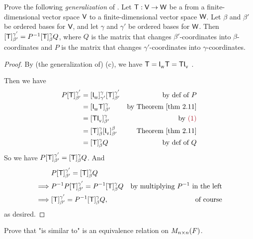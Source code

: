 \begin{exercise} \label{exercise 2.5.8}
Prove the following \emph{generalization} of .
Let \(\textsf{T} : \textsf{V} \to \textsf{W}\) be a \LTRAN{} from a finite-dimensional vector space \(\textsf{V}\) to a finite-dimensional vector space \(\textsf{W}\).
Let \(\beta\) and \(\beta'\) be ordered bases for \(\textsf{V}\), and let \(\gamma\) and \(\gamma'\) be ordered bases for \(\textsf{W}\).
Then \([\textsf{T}]_{\beta'}^{\gamma'} = P^{-1} [\textsf{T}]_{\beta}^{\gamma} Q\), where \(Q\) is the matrix that changes \(\beta'\)-coordinates into \(\beta\)-coordinates and \(P\) is the matrix that changes \(\gamma'\)-coordinates into \(\gamma\)-coordinates.
\end{exercise}

\begin{proof}
By (the generalization of) (c), we have \(\textsf{T} = \textsf{I}_{_{\textsf{W}}} \textsf{T} = \textsf{T} \textsf{I}_{_{\textsf{V}}}\) .

Then we have
\begin{align*}
    P [\T]_{\beta'}^{\gamma'}
        & = [\ITRANW]_{\gamma'}^{\gamma} [\T]_{\beta'}^{\gamma'} & \text{by def of \(P\)} \\
        & = [\ITRANW\T]_{\beta'}^{\gamma} & \text{by \THM{2.11}} \\
        & = [\T\ITRANV]_{\beta'}^{\gamma} & \text{by \MAROON{(1)}} \\
        & = [\T]_{\beta}^{\gamma} [\ITRANV]_{\beta'}^{\beta} & \text{\THM{2.11}} \\
        & = [\T]_{\beta}^{\gamma} Q & \text{by def of \(Q\)}
\end{align*}
So we have \(P [\textsf{T}]_{\beta'}^{\gamma'} = [\textsf{T}]_{\beta}^{\gamma} Q\).
And
\begin{align*}
             & P [\textsf{T}]_{\beta'}^{\gamma'} = [\textsf{T}]_{\beta}^{\gamma} Q \\
    \implies & P^{-1} P [\textsf{T}]_{\beta'}^{\gamma'} = P^{-1} [\textsf{T}]_{\beta}^{\gamma} Q & \text{by multiplying \(P^{-1}\) in the left} \\
    \implies & [\textsf{T}]_{\beta'}^{\gamma'} = P^{-1} [\textsf{T}]_{\beta}^{\gamma} Q, & \text{of course}
\end{align*}
as desired.
\end{proof}

\begin{exercise} \label{exercise 2.5.9}
Prove that "is similar to" is an equivalence relation on \(M_{n \times n}(F)\).
\end{exercise}

